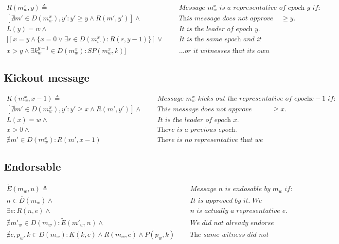 \documentclass{article}
\begin{document}
    \[
        \begin{aligned}
            R(m_w^x, y) \triangleq& \text{   } &\textit{Message $m_w^x$ is a representative of epoch $y$ if: } \\
            [\nexists m'\in D(m_w^x), y': y'\geq y \land R(m', y') ] \land & & \textit{This message does not approve representative with epoch $\geq y$.} \\
            L(y) = w \land & & \textit{It is the leader of epoch $y$. } \\
            [[ x=y \land \{ x = 0 \lor \exists r\in D(m_w^x) : R(r, y-1)\} ] \lor & & \textit{It is the same epoch and it approves the prev representative if it is not zero epoch} \\
            x>y\land \exists k_w^{y-1}\in D(m_w^x): SP(m_w^x, k) ] & & \textit{...or it witnesses that its own kickout has enough promises.}
        \end{aligned}
    \]

    \subsection*{Kickout message}
    \[
        \begin{aligned}
            K(m_w^x, x-1) \triangleq& \text{   } &\textit{Message $m_w^x$ kicks out the representative of epoch $x-1$ if: } \\
            [\nexists m'\in D(m_w^x), y': y'\geq x \land R(m', y') ] \land & & \textit{This message does not approve representative with epoch $\geq x$.} \\
            L(x) = w \land & & \textit{It is the leader of epoch $x$. } \\
            x > 0 \land & & \textit{There is a previous epoch.} \\
            \nexists m'\in D(m_w^x): R(m', x-1) & & \textit{There is no representative that we are kicking out.}
        \end{aligned}
    \]

    \subsection*{Endorsable}
    \[
        \begin{aligned}
            \widetilde{E}(m_w, n)  \triangleq & \text{   } &\textit{Message $n$ is endosable by $m_w$ if: } \\
            n \in \overline{D}(m_w) \land & & \textit{It is approved by it. We allow representative to endorse itself.} \\
            \exists e: R(n,e) \land & & \textit{$n$ is actually a representative of some epoch $e$.} \\
            \nexists m'_w \in D(m_w): \widetilde{E}(m'_w, n) \land && \textit{We did not already endorse it with some other message.} \\
            \nexists e,p_w, k\in D(m_w): K(k, e)\land R(m_w, e)\land P(p_w, k) & & \textit{The same witness did not already promise to kickout the very same epoch.}
        \end{aligned}
    \]
\end{document}
